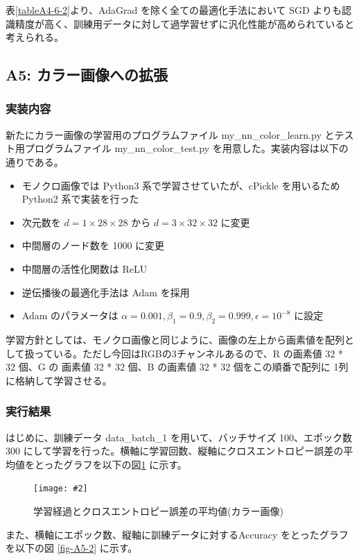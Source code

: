 \documentclass[a4paper,dvipdfmx]{jsarticle}
\newcommand{\image}[3]{
    \begin{figure}[H]
        \begin{center}
        \texttt{[image: \#2]}
        \end{center}
        \caption{#1}
        \label{#3}
    \end{figure}
}
\begin{document}
表\ref{tableA4-6-2}より、AdaGrad を除く全ての最適化手法において SGD よりも認識精度が高く、訓練用データに対して過学習せずに汎化性能が高められていると考えられる。

\subsection*{A5: カラー画像への拡張}

\subsubsection*{実装内容}

新たにカラー画像の学習用のプログラムファイル my\_nn\_color\_learn.py とテスト用プログラムファイル my\_nn\_color\_test.py を用意した。実装内容は以下の通りである。

\begin{itemize}
	\item モノクロ画像では Python3 系で学習させていたが、cPickle を用いるため Python2 系で実装を行った
	\item 次元数を $ d=1 \times 28 \times 28 $ から $ d=3 \times 32 \times 32 $ に変更
	\item 中間層のノード数を 1000 に変更
	\item 中間層の活性化関数は ReLU
	\item 逆伝播後の最適化手法は Adam を採用
	\item Adam のパラメータは $\alpha = 0.001, \beta_1 = 0.9, \beta_2 =  0.999, \epsilon = 10^{-8}$ に設定
\end{itemize}

学習方針としては、モノクロ画像と同じように、画像の左上から画素値を配列として扱っている。ただし今回はRGBの3チャンネルあるので、R の画素値 32 * 32 個、G の 画素値 32 * 32 個、B の画素値 32 * 32 個をこの順番で配列に 1列に格納して学習させる。

\subsubsection*{実行結果}

はじめに、訓練データ data\_batch\_1 を用いて、バッチサイズ 100、エポック数 300 にして学習を行った。横軸に学習回数、縦軸にクロスエントロピー誤差の平均値をとったグラフを以下の図\ref{fig-A5-1} に示す。

\image{学習経過とクロスエントロピー誤差の平均値(カラー画像)}{report_a5-1.png}{fig-A5-1}

また、横軸にエポック数、縦軸に訓練データに対するAccuracy をとったグラフを以下の図 \ref{fig-A5-2} に示す。
\end{document}
